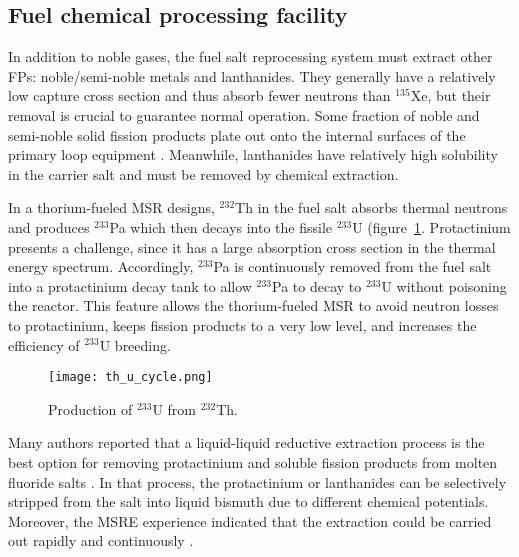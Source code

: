 \subsection{Fuel chemical processing facility} \label{sec:chemical_processing}
In addition to noble gases, the fuel salt reprocessing system must extract 
other \glspl{FP}: noble/semi-noble metals and lanthanides. They generally have 
a relatively low capture cross section and thus absorb fewer neutrons than 
$^{135}$Xe, but their removal is crucial to guarantee normal operation. Some 
fraction of noble and semi-noble solid fission products plate out onto the 
internal surfaces of the primary loop equipment  
\cite{briggs_molten-salt_1964}. Meanwhile, lanthanides have relatively high 
solubility in the carrier salt and must be removed by chemical extraction. 

In a thorium-fueled \gls{MSR} designs, $^{232}$Th in the fuel salt absorbs 
thermal neutrons and produces $^{233}$Pa which then decays into the fissile 
$^{233}$U (figure~\ref{fig:th_u_reaction}. Protactinium presents a challenge, 
since it has a large absorption cross section in the thermal energy spectrum. 
Accordingly, $^{233}$Pa is continuously removed from the fuel salt into a 
protactinium decay tank to allow $^{233}$Pa to decay to $^{233}$U without 
poisoning the reactor. This feature allows the thorium-fueled \gls{MSR} to 
avoid neutron losses to protactinium, keeps fission products to a very low 
level, and increases the efficiency of $^{233}$U breeding. 
\begin{figure}[htp!] %
	\centering
	\texttt{[image: th\_u\_cycle.png]}
	\caption{Production of $^{233}$U from $^{232}$Th.}
	\label{fig:th_u_reaction}
\end{figure}

Many authors reported that a liquid-liquid reductive extraction process is the 
best option for removing protactinium and soluble fission products from 
molten fluoride salts \cite{briggs_molten-salt_1969, delpech_molten_2010, 
doligez_coupled_2014}. In that process, the protactinium or lanthanides can be 
selectively stripped from the salt into liquid bismuth due to different 
chemical potentials. Moreover, the \gls{MSRE} experience indicated that the 
extraction could be carried out rapidly and continuously  
\cite{whatley_engineering_1970}.

